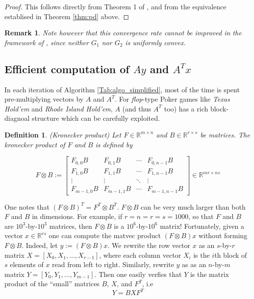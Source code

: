 \documentclass[12pt]{article}
\newtheorem{remark}{Remark}
\newtheorem{definition}[theorem]{Definition}
\begin{document}
\begin{proof}
This follows directly from Theorem 1 of \cite{chambolle2010}, and from the equivalence establised in Theorem \ref{thm:pd} above.
\end{proof}

\begin{remark}
Note however that this convergence rate cannot be improved in the framework of \cite{chambolle2010}, since neither $G_1$ nor $G_2$ is \textit{uniformly convex}.
\end{remark}

\subsection{Efficient computation of $Ay$ and $A^Tx$}
In each iteration of Algorithm \ref{Tab:algo_simplified}, most of the time is spent
pre-multiplying vectors by $A$ and $A^T$. For \textit{flop}-type Poker games like \textit{Texas Hold'em} and  \textit{Rhode Island Hold'em}, $A$ (and thus $A^T$ too) has a rich block-diagnoal structure which can be carefully exploited.

\begin{definition}(Kronecker product)
Let $F \in \mathbb{R}^{m \times n}$ and $B \in \mathbb{R}^{r \times s}$ be matrices. The kronecker product of $F$ and $B$ is defined by

\begin{equation}
F \otimes B:=\left[
\begin{array}{cccc}
F_{0,0}B & F_{0,1}B & \cdots & F_{0,n-1}B \\
F_{1,0}B & F_{1,1}B & \cdots & F_{1,n-1}B \\
\vdots & \vdots & \ddots & \vdots\\
F_{m-1,0}B & F_{m-1,1}B & \cdots & F_{m-1,n-1}B 
\end{array}\right] \in \mathbb{R}^{mr \times ns}
\end{equation}
\end{definition}

One notes that $(F \otimes B)^T = F^T \otimes B^T$.
$F \otimes B$ can be very much larger than both $F$ and $B$ in dimensions. For example, if $r = n = r = s = 1000$, so that $F$ and $B$ are $10^3$-by-$10^3$ matrices, then $F \otimes B$ is a $10^6$-by-$10^6$ matrix! Fortunately, given a vector $x \in \mathbb{R}^{rs}$ one can compute the matvec product $(F \otimes B)x$ without forming $F \otimes B$. Indeed, let $y := (F \otimes B)x$. We rewrite the row vector $x$ as an $s$-by-$r$ matrix $X = [X_0, X_1, ..., X_{r-1}]$, where each column vector $X_i$ is the $i$th block of $s$ elements of $x$ read from left to right. Similarly, rewrite $y$ as as an $n$-by-$m$ matrix $Y = [Y_0, Y_1, ..., Y_{m-1}]$. Then one easily verfies that $Y$ is the matrix product of the ``small'' matrices $B$, $X$, and $F^T$, i.e
\begin{equation}
  \label{eq:kron_matvec}
  Y = BXF^T
\end{equation}
\end{document}
